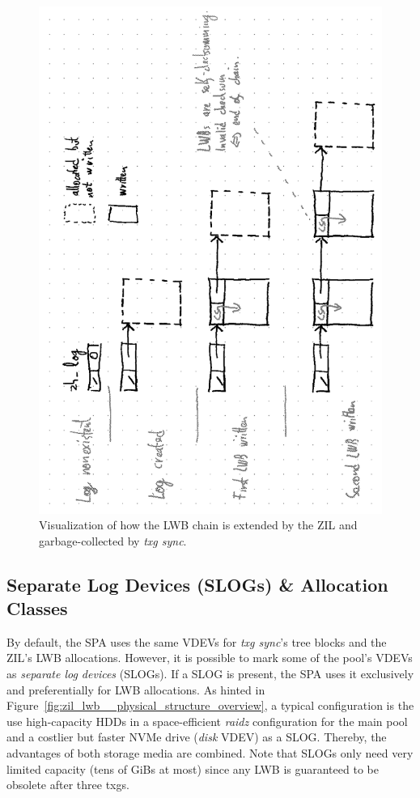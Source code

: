 \documentclass[12pt,a4paper,twoside]{book}
\begin{document}
\begin{figure}[H]
    \centering
    \includegraphics{fig/zil_lwb__physical_structure_append}
    \caption{Visualization of how the LWB chain is extended by the ZIL and garbage-collected by \textit{txg sync}.
    }
    \label{fig:zil_lwb__physical_structure_append}
\end{figure}

\subsection{Separate Log Devices (SLOGs) \& Allocation Classes}

By default, the SPA uses the same VDEVs for \textit{txg sync}'s tree blocks and the ZIL's LWB allocations.
However, it is possible to mark some of the pool's VDEVs as \textit{separate log devices} (SLOGs).
If a SLOG is present, the SPA uses it exclusively and preferentially for LWB allocations.
As hinted in Figure~\ref{fig:zil_lwb__physical_structure_overview}, a typical configuration is the use high-capacity HDDs in a space-efficient \textit{raidz} configuration for the main pool and a costlier but faster NVMe drive (\textit{disk} VDEV) as a SLOG.
Thereby, the advantages of both storage media are combined.
Note that SLOGs only need very limited capacity (tens of GiBs at most) since any LWB is guaranteed to be obsolete after three txgs.
\end{document}
